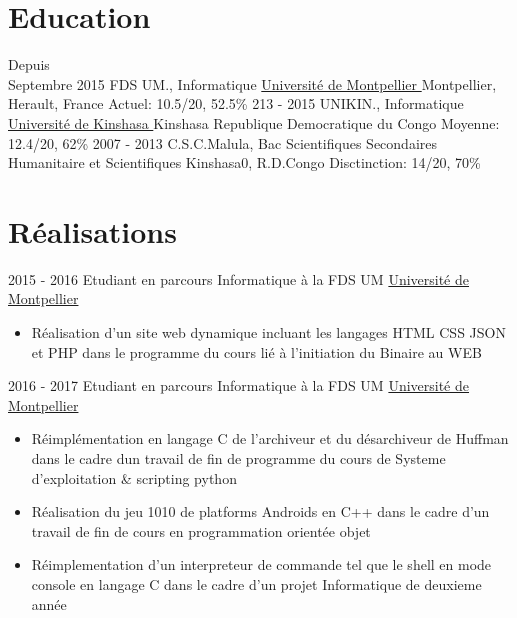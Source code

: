 \documentclass[letterpaper]{twentysecondcv} %
\begin{document}
\makeprofile %

\section{Education}

\begin{twenty} %
	\twentyitem
    	{Depuis \\ Septembre 2015}
        {FDS UM., Informatique}
        {\href{http://sciences.edu.umontpellier.fr/}{Universit\'e de Montpellier }}
        {Montpellier, Herault, France}
        {Actuel: 10.5/20, 52.5\%}
	\twentyitem
    	{213 - 2015}
        {UNIKIN., Informatique }
        {\href{http://unikin.sciences.free.fr/}{Universit\'e de Kinshasa }}
        {Kinshasa Republique Democratique du Congo}
        {Moyenne: 12.4/20, 62\%}
	\twentyitem
    	{2007 - 2013}
        {C.S.C.Malula, Bac Scientifiques}
        {Secondaires Humanitaire et Scientifiques }
        {Kinshasa0, R.D.Congo}
        {Disctinction: 14/20, 70\%}
\end{twenty}


\section{R\'ealisations}
\begin{twenty}
	\twentyitem
    	{2015 - 2016}
        {Etudiant en parcours Informatique à la FDS UM}
        {\href{http://sciences.edu.umontpellier.fr/}{Universit\'e de Montpellier }}
        {}
        {
        {\begin{itemize}
        \item Réalisation d'un site web dynamique incluant les langages HTML CSS JSON  et PHP dans le programme du cours lié à l'initiation du Binaire au WEB
    \end{itemize}}
        }
	\twentyitem
    	{2016 - 2017}
        {Etudiant en parcours Informatique à la FDS UM}
        {\href{http://sciences.edu.umontpellier.fr/}{Universit\'e de Montpellier }}
        {}
        {
        {\begin{itemize}
        \item R\'eimpl\'ementation en langage C de l'archiveur et du d\'esarchiveur de Huffman dans le cadre dun travail de fin de programme du cours de Systeme d'exploitation \& scripting python 
        \item R\'ealisation du jeu 1010 de platforms Androids en C++ dans le cadre d'un travail de fin de cours en programmation orient\'ee objet
        \item R\'eimplementation d'un interpreteur de commande tel que le shell en mode console en langage C dans le cadre d'un projet Informatique de deuxieme ann\'ee
        
    \end{itemize}}
        }
\end{twenty}
\end{document}
